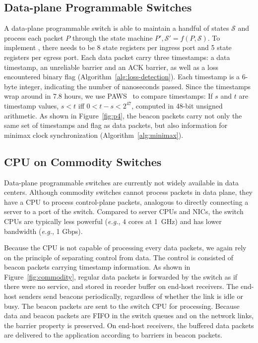 \subsection{Data-plane Programmable Switches}
\label{sec:p4}

A data-plane programmable switch is able to maintain a handful of states $\mathcal{S}$ and process each packet $P$ through the state machine $P', \mathcal{S}' = f(P, \mathcal{S})$.
To implement \sys, there needs to be 8 state registers per ingress port and 5 state registers per egress port.
Each data packet carry three timestamps: a data timestamp, an unreliable barrier and an ACK barrier, as well as a loss encountered binary flag (Algorithm~\ref{alg:loss-detection}).
Each timestamp is a 6-byte integer, indicating the number of nanoseconds passed. Since the timestamps wrap around in 7.8 hours, we use PAWS~\cite{jacobson1992tcp} to compare timestamps: If $s$ and $t$ are timestamp values, $s < t$ iff $0 < t - s < 2^{47}$, computed in 48-bit unsigned arithmetic.
As shown in Figure~\ref{fig:p4}, the beacon packets carry not only the same set of timestamps and flag as data packets, but also information for minimax clock synchronization (Algorithm~\ref{alg:minimax}).

\subsection{CPU on Commodity Switches}
\label{sec:commodity}

Data-plane programmable switches are currently not widely available in data centers. Although commodity switches cannot process packets in data plane, they have a CPU to process control-plane packets, analogous to directly connecting a server to a port of the switch. Compared to server CPUs and NICs, the switch CPUs are typically less powerful (\textit{e.g.}, 4 cores at 1~GHz) and has lower bandwidth (\textit{e.g.}, 1 Gbps).

Because the CPU is not capable of processing every data packets, we again rely on the principle of separating control from data. The control is consisted of beacon packets carrying timestamp information. As shown in Figure~\ref{fig:commodity}, regular data packets is forwarded by the switch as if there were no \sys service, and stored in reorder buffer on end-host receivers. The end-host senders send beacons periodically, regardless of whether the link is idle or busy. The beacon packets are sent to the switch CPU for processing. Because data and beacon packets are FIFO in the switch queues and on the network links, the barrier property is preserved. On end-host receivers, the buffered data packets are delivered to the application according to barriers in beacon packets.

